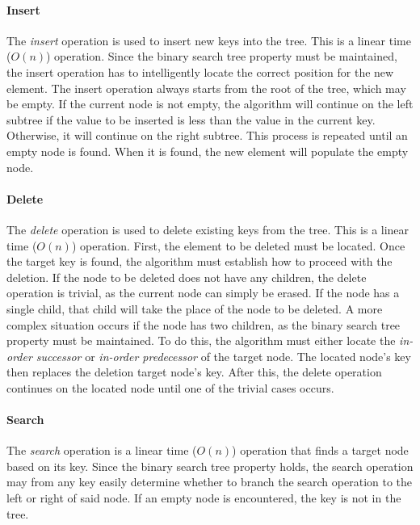\documentclass{article}
\begin{document}
\paragraph{Insert}
The {\em insert} operation is used to insert new keys into the tree. This is a linear time (\(O(n)\)) operation.
Since the binary search tree property must be maintained, the insert operation has to intelligently locate the
correct position for the new element. The insert operation always starts from the root of the tree,
which may be empty. If the current node is not empty, the algorithm will continue on the left subtree if
the value to be inserted is less than the value in the current key. Otherwise, it will continue on the right
subtree. This process is repeated until an empty node is found. When it is found, the new element will populate
the empty node.

\paragraph{Delete}
The {\em delete} operation is used to delete existing keys from the tree. This is a linear time (\(O(n)\))
operation. First, the element to be deleted must be located. Once the target key is found, the algorithm must
establish how to proceed with the deletion. If the node to be deleted does not have any children, the delete
operation is trivial, as the current node can simply be erased. If the node has a single child, that child will
take the place of the node to be deleted. A more complex situation occurs if the node has two children, as the
binary search tree property must be maintained. To do this, the algorithm must either locate the
{\em in-order successor} or {\em in-order predecessor} of the target node. The located node's key then replaces
the deletion target node's key. After this, the delete operation continues on the located node until one of the
trivial cases occurs.

\paragraph{Search}
The {\em search} operation is a linear time (\(O(n)\)) operation that finds a target node based on its key.
Since the binary search tree property holds, the search operation may from any key easily determine whether to
branch the search operation to the left or right of said node. If an empty node is encountered, the key is
not in the tree.
\end{document}
